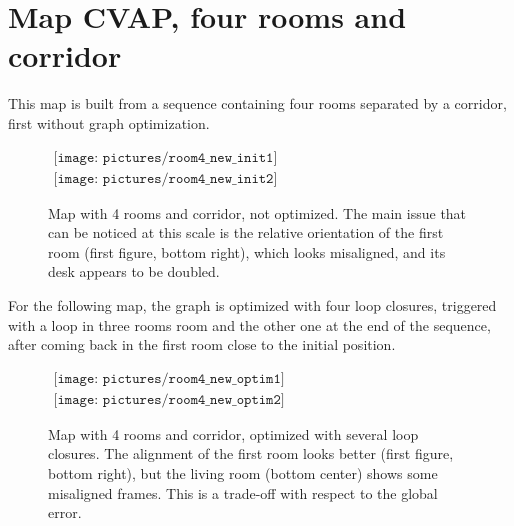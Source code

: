 \clearpage
\section{Map CVAP, four rooms and corridor}

This map is built from a sequence containing four rooms separated by a corridor, first without graph optimization. 

\begin{figure}[H]
\centering$
 \begin{array}{c}
 \texttt{[image: pictures/room4\_new\_init1]}\\
 \texttt{[image: pictures/room4\_new\_init2]}
 \end{array}$
\caption{Map with 4 rooms and corridor, not optimized. The main issue that can be noticed at this scale is the relative orientation of the first room (first figure, bottom right), which looks misaligned, and its desk appears to be doubled.}
\end{figure}

\clearpage
For the following map, the graph is optimized with four loop closures, triggered with a loop in three rooms room and the other one at the end of the sequence, after coming back in the first room close to the initial position.

\begin{figure}[H]
\centering$
 \begin{array}{c}
 \texttt{[image: pictures/room4\_new\_optim1]}\\
 \texttt{[image: pictures/room4\_new\_optim2]}
 \end{array}$
\caption{Map with 4 rooms and corridor, optimized with several loop closures. The alignment of the first room looks better (first figure, bottom right), but the living room (bottom center) shows some misaligned frames. This is a trade-off with respect to the global error.}
\end{figure}

